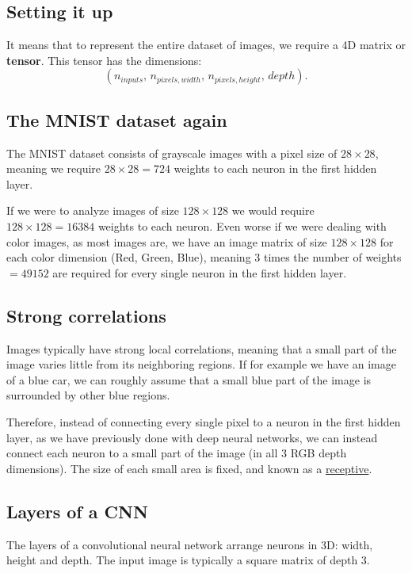 \documentclass[%
oneside,                 %
final,                   %
10pt]{article}
\begin{document}
\subsection{Setting it up}

It means that to represent the entire
dataset of images, we require a 4D matrix or \textbf{tensor}. This tensor has the dimensions:  
\[  
(n_{inputs},\, n_{pixels, width},\, n_{pixels, height},\, depth) .
\]

\subsection{The MNIST dataset again}

The MNIST dataset consists of grayscale images with a pixel size of
$28\times 28$, meaning we require $28 \times 28 = 724$ weights to each
neuron in the first hidden layer.

If we were to analyze images of size $128\times 128$ we would require
$128 \times 128 = 16384$ weights to each neuron. Even worse if we were
dealing with color images, as most images are, we have an image matrix
of size $128\times 128$ for each color dimension (Red, Green, Blue),
meaning 3 times the number of weights $= 49152$ are required for every
single neuron in the first hidden layer.


\subsection{Strong correlations}

Images typically have strong local correlations, meaning that a small
part of the image varies little from its neighboring regions. If for
example we have an image of a blue car, we can roughly assume that a
small blue part of the image is surrounded by other blue regions.

Therefore, instead of connecting every single pixel to a neuron in the
first hidden layer, as we have previously done with deep neural
networks, we can instead connect each neuron to a small part of the
image (in all 3 RGB depth dimensions).  The size of each small area is
fixed, and known as a \href{{https://en.wikipedia.org/wiki/Receptive_field}}{receptive}.


\subsection{Layers of a CNN}

The layers of a convolutional neural network arrange neurons in 3D: width, height and depth.  
The input image is typically a square matrix of depth 3. 
\end{document}
